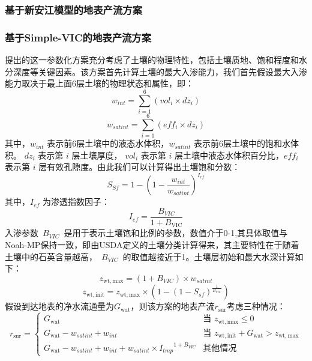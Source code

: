 \subsubsection{基于新安江模型的地表产流方案}

\subsubsection{基于Simple-VIC的地表产流方案}
\cite{Liang2003Anew}提出的这一参数化方案充分考虑了土壤的物理特性，包括土壤质地、饱和程度和水分深度等关键因素。该方案首先计算土壤的最大入渗能力，我们首先假设最大入渗能力取决于最上面6层土壤的物理状态和属性，即：
\begin{equation}
w_{{int}} = \sum_{i=1}^{6}\left( {vol}_{i} \times {dz}_{i} \right)
\end{equation}
\begin{equation}
w_{{satint}} = \sum_{i=1}^{6}\left( {eff}_{i} \times {dz}_{i} \right)
\end{equation}
其中，$w_{{int}}$ 表示前6层土壤中的液态水体积，$w_{{satint}}$ 表示前6层土壤中的饱和水体积。 ${dz}_{i}$ 表示第 $i$ 层土壤厚度， ${vol}_{i}$ 表示第 $i$ 层土壤中液态水体积百分比，${eff}_{i}$ 表示第 $i$ 层有效孔隙度。由此我们可以计算得出土壤饱和分数：
\begin{equation}
{S}_{{Sf}} = 1 - \left( 1 - \frac{w_{{int}}}{w_{{satint}}} \right)^{{I}_{{ef}}}
\end{equation}
其中，${I}_{{ef}}$ 为渗透指数因子：
\begin{equation}
{I}_{{ef}} = \frac{B_{{VIC}}}{1 + B_{\text{VIC}}}
\end{equation}
入渗参数~$B_{{VIC}}$~是用于表示土壤饱和比例的参数，数值介于0-1,其具体取值与Noah-MP保持一致，即由USDA定义的土壤分类计算得来，其主要特性在于随着土壤中的石英含量越高，~$B_{VIC}$~的取值越接近于1。土壤层初始和最大水深计算如下：
\begin{equation}
z_{\mathrm{wt,max}}= \left( 1 + B_{{VIC}} \right) \times w_{{satint}}
\end{equation}
\begin{equation}
z_{\mathrm{wt,init}} = z_{\mathrm{wt,max}} \times \left( 1 - \left( 1 - {S}_{{sf}} \right)^{\frac{1}{B_{{VIC}}}} \right)
\end{equation}
假设到达地表的净水流通量为$G_{\mathrm{wat}}$，则该方案的地表产流$r_{\mathrm{sur}}$考虑三种情况：
\begin{equation}
r_{\mathrm{sur}} = 
\begin{cases}
G_{\mathrm{wat}} & \text{当 } z_{\mathrm{wt,max}} \leq 0 \\
G_{\mathrm{wat}} - w_{{satint}} + w_{{int}} & \text{当 } z_{\mathrm{wt,init}} + G_{\mathrm{wat}} > z_{\mathrm{wt,max}} \\
G_{\mathrm{wat}}- w_{{satint}} + w_{{int}} + w_{{satint}} \times {{I}_{{tmp}}}^{1 + B_{{VIC}}} & \text{其他情况}
\end{cases}
\end{equation}
